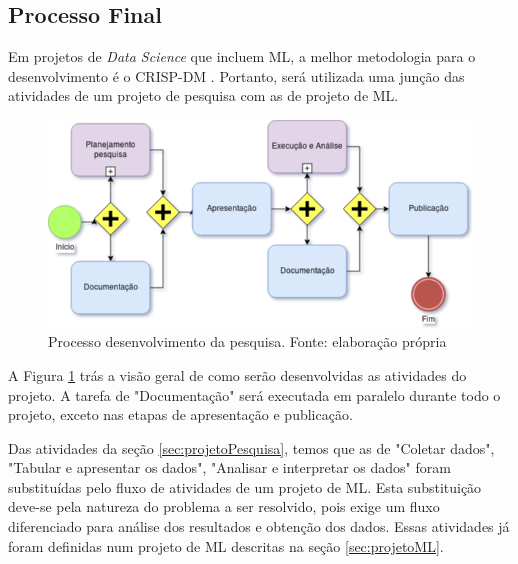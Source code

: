 \subsection{Processo Final}

Em projetos de \textit{Data Science} que incluem ML, a melhor metodologia para o desenvolvimento é o CRISP-DM \cite{CROWSTON2017}.
Portanto, será utilizada uma junção das atividades de um projeto de pesquisa com as de projeto de ML.

\begin{figure}[h]
	\centering
    \includegraphics[keepaspectratio=true,scale=0.5]{figuras/processoPrincipal}
	\caption[Processo desenvolvimento da pesquisa]{Processo desenvolvimento da pesquisa. Fonte: elaboração própria}
	\label{fig:processoPrincipal}
\end{figure}

A Figura \ref{fig:processoPrincipal} trás a visão geral de como serão desenvolvidas as atividades do projeto. A tarefa de "Documentação" será executada em paralelo durante todo o projeto, exceto nas etapas de apresentação e publicação.

Das atividades da seção \ref{sec:projetoPesquisa}, temos que as de "Coletar dados", "Tabular e apresentar os dados", "Analisar e interpretar os dados" foram substituídas pelo fluxo de atividades de um projeto de ML. Esta substituição deve-se pela natureza do problema a ser resolvido, pois exige um fluxo diferenciado para análise dos resultados e obtenção dos dados. Essas atividades já foram definidas num projeto de ML descritas na seção \ref{sec:projetoML}.

